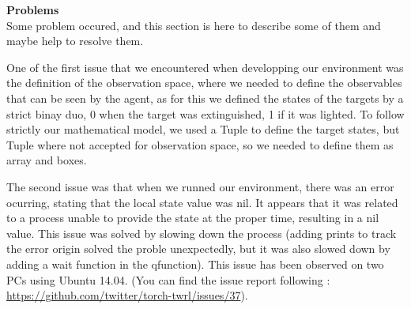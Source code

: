 \documentclass[conference]{IEEEtran}
\newlength\figureheight
\newlength\figurewidth
\newcommand*{\SET}[1]{\ensuremath{\boldsymbol{#1}}}
\begin{document}
\textbf{Problems}\\

Some problem occured, and this section is here to describe some of them and maybe help to resolve them.

One of the first issue that we encountered when developping our environment was the definition of the observation space, where we needed to define the observables that can be seen by the agent, as for this we defined the states of the targets by a strict binay duo, 0 when the target was extinguished, 1 if it was lighted. To follow strictly our mathematical model, we used a Tuple to define the target states, but Tuple where not accepted for observation space, so we needed to define them as array and boxes.

The second issue was that when we runned our environment, there was an error ocurring, stating that the local state value was nil. It appears that it was related to a process unable to provide the state at the proper time, resulting in a nil value. This issue was solved by slowing down the process (adding prints to track the error origin solved the proble unexpectedly, but it was also slowed down by adding a wait function in the qfunction). This issue has been observed on two PCs using Ubuntu 14.04. (You can find the issue report following : \url{https://github.com/twitter/torch-twrl/issues/37}).






%  
\end{document}
